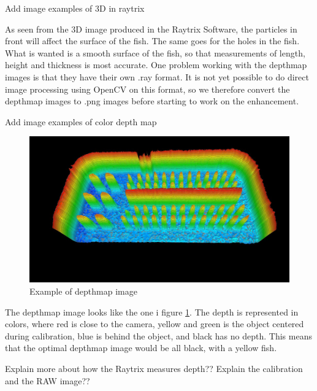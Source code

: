{\color{red}Add image examples of 3D in raytrix}

As seen from the 3D image produced in the Raytrix Software, the particles in front will affect the surface of the fish. The same goes for the holes in the fish. What is wanted is a smooth surface of the fish, so that measurements of length, height and thickness is most accurate. 
One problem working with the depthmap images is that they have their own .ray format. It is not yet possible to do direct image processing using OpenCV on this format, so we therefore convert the depthmap images to .png images before starting to work on the enhancement.

{\color{red}Add image examples of color depth map}
\begin{figure}[h]
    \centering
    \includegraphics[width=.9\linewidth]{Images/depthmap_raytrix}
    \caption{Example of depthmap image}
    \label{fig:raytrix_depthmap}
\end{figure}

The depthmap image looks like the one i figure \ref{fig:raytrix_depthmap}. The depth is represented in colors, where red is close to the camera, yellow and green is the object centered during calibration, blue is behind the object, and black has no depth. This means that the optimal depthmap image would be all black, with a yellow fish.


{\color{red}Explain more about how the Raytrix measures depth?? Explain the calibration and the RAW image??}